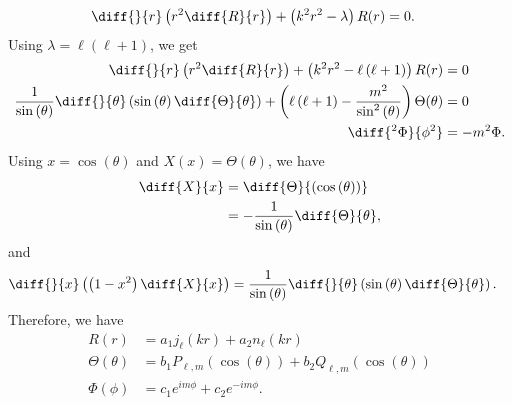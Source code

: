 \documentclass[10pt]{mypackage}
\begin{document}
\begin{solution}[41.8]
\begin{align*}
    \diff{}{r}\left( r^2\diff{R}{r} \right) + \left( k^2r^2 - \lambda \right)R(r) &= 0.
  \end{align*}
  Using $\lambda = \ell\left( \ell + 1 \right)$, we get
  \begin{align*}
    \diff{}{r}\left( r^2\diff{R}{r} \right) + \left( k^2r^2 - \ell\left( \ell + 1 \right) \right)R(r) &= 0\\
    \frac{1}{\sin\left( \theta \right)}\diff{}{\theta}\left( \sin\left( \theta \right)\diff{\Theta}{\theta} \right) + \left( \ell\left( \ell + 1 \right) - \frac{m^2}{\sin^2\left( \theta \right)} \right)\Theta(\theta) &= 0\\
    \diff{^2\Phi}{\phi^2} &= -m^2\Phi.
  \end{align*}
  Using $x = \cos\left( \theta \right)$ and $X(x) = \Theta(\theta)$, we have
  \begin{align*}
    \diff{X}{x} &= \diff{\Theta}{\left( \cos\left( \theta \right) \right)}\\
                &= -\frac{1}{\sin\left( \theta \right)} \diff{\Theta}{\theta},
  \end{align*}
  and
  \begin{align*}
    \diff{}{x}\left( \left( 1-x^2 \right)\diff{X}{x} \right) &= \frac{1}{\sin\left( \theta \right)}\diff{}{\theta}\left( \sin\left( \theta \right)\diff{\Theta}{\theta} \right).
  \end{align*}
  Therefore, we have
  \begin{align*}
    R(r) &= a_1j_{\ell}\left( kr \right) + a_2n_{\ell}\left( kr \right)\\
    \Theta(\theta) &= b_1P_{\ell,m}\left( \cos\left( \theta \right) \right) + b_2Q_{\ell,m}\left( \cos\left( \theta \right) \right)\\
    \Phi(\phi) &= c_1e^{im\phi} + c_2e^{-im\phi}.
  \end{align*}
\end{solution}
\end{document}
